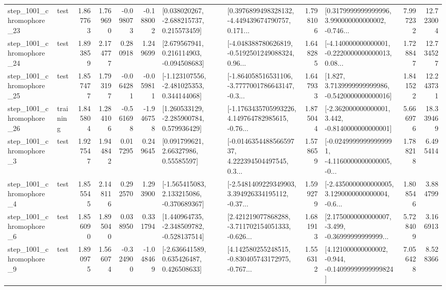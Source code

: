 \begin{tabular}{llrrrrllrlrr}
 step\_1001\_chromophore\_23 &      test &      1.867763 &    1.769690 &     -0.098073 & -0.188002 &    [0.038020267, -2.688215737, 0.215573459] &  [0.3976899498328132, -4.449439674790757, 0.171... &       1.798106 &  [0.3179999999999996, 3.990000000000002, -0.746... &            7.997232 &         12.723004 \\
 step\_1001\_chromophore\_24 &      test &      1.893859 &    2.174777 &      0.280918 &  1.249699 &    [2.679567941, 0.216114903, -0.094508683] &  [-4.048388780626819, -0.5192501249088324, 0.96... &       1.648285 &  [-4.140000000000001, -0.2220000000000013, 0.08... &            1.728847 &         12.734527 \\
 step\_1001\_chromophore\_25 &      test &      1.857477 &    1.793197 &     -0.064281 & -0.059811 &   [-1.123107556, -2.481025353, 0.344144068] &  [-1.864058516531106, -3.7777001786643147, -0.3... &       1.647933 &   [1.827, 3.7139999999999986, -0.5420000000000016] &            1.841522 &         12.243731 \\
 step\_1001\_chromophore\_26 &  training &      1.845804 &    1.284106 &     -0.561698 & -1.946758 &    [1.260533129, -2.285900784, 0.579936429] &  [-1.1763435705993226, 4.149764782985615, -0.76... &       1.875044 &   [-2.362000000000001, 3.442, -0.8140000000000001] &            5.666976 &         18.339469 \\
  step\_1001\_chromophore\_3 &      test &      1.927547 &    1.944842 &      0.017295 &  0.249645 &       [0.091799621, 2.66327986, 0.55585597] &  [-0.014635448856659737, 4.222394504497545, 0.3... &       1.578659 &  [-0.02499999999999991, -4.1160000000000005, -0... &            1.788218 &          6.495414 \\
  step\_1001\_chromophore\_4 &      test &      1.855545 &    2.148116 &      0.292570 &  1.293900 &   [-1.565415083, 2.133215086, -0.370689367] &  [-2.5481409229349903, 3.394926334195112, -0.37... &       1.599279 &  [-2.4350000000000005, 3.1290000000000004, -0.6... &            1.808546 &          3.884799 \\
  step\_1001\_chromophore\_6 &      test &      1.856090 &    1.895040 &      0.038950 &  0.331794 &   [1.440964735, -2.348509782, -0.528137514] &  [2.421219077868288, -3.711702154051333, -0.626... &       1.681913 &  [2.1750000000000007, -3.499, -0.36999999999999... &            5.728409 &          3.166913 \\
  step\_1001\_chromophore\_9 &      test &      1.890975 &    1.566074 &     -0.324900 & -1.048469 &    [-2.636641589, 0.635426487, 0.426508633] &  [4.142580255248515, -0.830405743172975, -0.767... &       1.556312 &  [4.121000000000002, -0.944, -0.14099999999999824] &            7.056428 &          8.528366 \\

\end{tabular}
